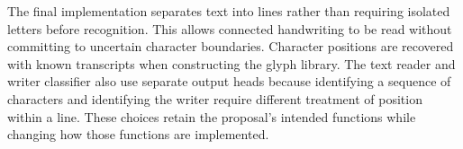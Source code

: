 The final implementation separates text into lines rather than requiring isolated letters before recognition. This allows connected handwriting to be read without committing to uncertain character boundaries. Character positions are recovered with known transcripts when constructing the glyph library. The text reader and writer classifier also use separate output heads because identifying a sequence of characters and identifying the writer require different treatment of position within a line. These choices retain the proposal's intended functions while changing how those functions are implemented.
\FloatBarrier
